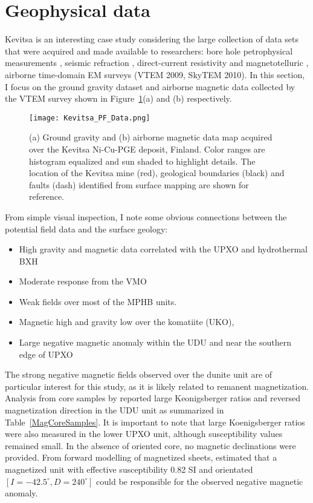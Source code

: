 \section{Geophysical data}
Kevitsa is an interesting case study considering the large collection of data sets that were acquired and made available to researchers: bore hole petrophysical measurements \cite[]{Montonen2012}, seismic refraction \cite[]{Koivisto2015}, direct-current resistivity and magnetotelluric \cite[]{Le2016}, airborne time-domain EM surveys (VTEM 2009, SkyTEM 2010).
In this section, I focus on the ground gravity dataset and airborne magnetic data collected by the VTEM survey shown in Figure~\ref{Kevitsa_PF_Data}(a) and (b) respectively.

\begin{figure}
\texttt{[image: Kevitsa\_PF\_Data.png]}
\caption{(a) Ground gravity and (b) airborne magnetic data map acquired over the Kevitsa Ni-Cu-PGE deposit, Finland. Color ranges are histogram equalized and sun shaded to highlight details. The location of the Kevitsa mine (red), geological boundaries (black) and faults (dash) identified from surface mapping are shown for reference.}
\label{Kevitsa_PF_Data}
\end{figure}

From simple visual inspection, I note some obvious connections between the potential field data and the surface geology:
\begin{itemize}
\item High gravity and magnetic data correlated with the UPXO and hydrothermal BXH
\item Moderate response from the VMO
\item Weak fields over most of the MPHB units.
\item Magnetic high and gravity low over the komatiite (UKO),
\item Large negative magnetic anomaly within the UDU and near the southern edge of UPXO
\end{itemize}
The strong negative magnetic fields observed over the dunite unit are of particular interest for this study, as it is likely related to remanent magnetization.
Analysis from core samples by \cite{Montonen2012} reported large Keonigsberger ratios and reversed magnetization direction in the UDU unit as summarized in Table~\ref{MagCoreSamples}. It is important to note that large Koenigsberger ratios were also measured in the lower UPXO unit, although susceptibility values remained small. In the absence of oriented core, no magnetic declinations were provided. From forward modelling of magnetized sheets, \cite{Montonen2012} estimated that a magnetized unit with effective susceptibility 0.82 SI and orientated $[I=-42.5^\circ, D=240^\circ]$ could be responsible for the observed negative magnetic anomaly.

